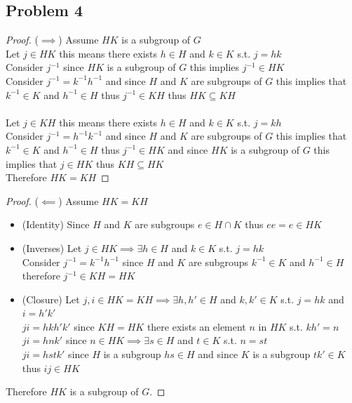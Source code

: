 \documentclass[12pt, letterpaper]{article}
\theoremstyle{definition}
\begin{document}
\subsection*{Problem 4}

\begin{proof}($\implies$)
    Assume $HK$ is a subgroup of $G$\\
    Let $j\in HK$ this means there exists $h\in H$ and $k\in K$ s.t. $j=hk$\\
    Consider $j^{-1}$ since $HK$ is a subgroup of $G$ this implies $j^{-1} \in HK$\\
    Consider $j^{-1}=k^{-1}h^{-1}$ and since $H$ and $K$ are subgroups of $G$ this implies
    that $k^{-1} \in K$ and $h^{-1} \in H$ thus $j^{-1} \in KH$ thus $HK \subseteq KH$\\
    \phantom{text}\\
    Let $j\in KH$ this means there exists $h\in H$ and $k \in K$ s.t. $j=kh$\\
    Consider $j^{-1}=h^{-1}k^{-1}$ and since $H$ and $K$ are subgroups of $G$ this implies
    that $k^{-1} \in K$ and $h^{-1} \in H$ thus $j^{-1} \in HK$ and since $HK$ is a subgroup of $G$
    this implies that $j \in HK$ thus $KH \subseteq HK$\\
    Therefore $HK=KH$
\end{proof}
\begin{proof}($\impliedby$)
    Assume $HK=KH$
    \begin{itemize}
        \item (Identity) Since $H$ and $K$ are subgroups $e \in H\cap K$ thus $ee=e\in HK$
        \item (Inverses) Let $j\in HK \implies \exists h\in H$ and $k\in K$ s.t. $j=hk$\\
        Consider $j^{-1}=k^{-1}h^{-1}$ since $H$ and $K$ are subgroups $k^{-1}\in K$ and $h^{-1}\in H$\\
        therefore $j^{-1}\in KH=HK$
        \item (Closure) Let $j,i \in HK=KH \implies \exists h,h'\in H$ and $k,k'\in K$ s.t. $j=hk$ and $i=h'k'$\\
        $ji=hkh'k'$ since $KH=HK$ there exists an element $n$ in $HK$ s.t. $kh'=n$\\
        $ji=hnk'$  since $n\in HK \implies \exists s \in H$ and $t \in K$ s.t. $n=st$\\
        $ji=hstk'$ since $H$ is a subgroup $hs \in H$ and since $K$ is a subgroup $tk'\in K$ thus $ij\in HK$  
    \end{itemize}
    Therefore $HK$ is a subgroup of $G$.
\end{proof}
\end{document}
